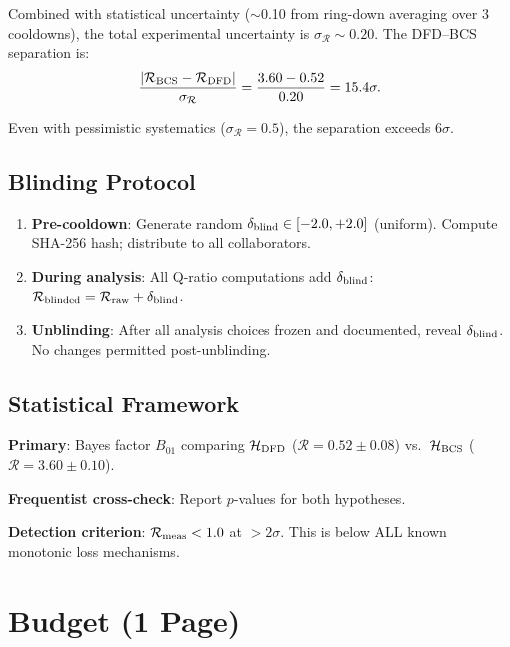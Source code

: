 \documentclass[11pt]{article}
\newcommand{\Rq}{\mathcal{R}}
\begin{document}
Combined with statistical uncertainty ($\sim$0.10 from ring-down
averaging over 3 cooldowns), the total experimental uncertainty is
$\sigma_{\Rq} \sim 0.20$. The DFD--BCS separation is:
\begin{equation}
\frac{|\Rq_{\rm BCS} - \Rq_{\rm DFD}|}{\sigma_{\Rq}}
= \frac{3.60 - 0.52}{0.20} = 15.4\sigma.
\end{equation}

Even with pessimistic systematics ($\sigma_{\Rq} = 0.5$), the
separation exceeds $6\sigma$.

\subsection{Blinding Protocol}

\begin{enumerate}[nosep]
\item \textbf{Pre-cooldown}: Generate random $\delta_{\rm blind}
  \in [-2.0, +2.0]$ (uniform). Compute SHA-256 hash; distribute to
  all collaborators.
\item \textbf{During analysis}: All Q-ratio computations add
  $\delta_{\rm blind}$: $\Rq_{\rm blinded} = \Rq_{\rm raw} +
  \delta_{\rm blind}$.
\item \textbf{Unblinding}: After all analysis choices frozen and
  documented, reveal $\delta_{\rm blind}$. No changes permitted
  post-unblinding.
\end{enumerate}

\subsection{Statistical Framework}

\textbf{Primary}: Bayes factor $B_{01}$ comparing
$\mathcal{H}_{\rm DFD}$ ($\Rq = 0.52 \pm 0.08$) vs.\
$\mathcal{H}_{\rm BCS}$ ($\Rq = 3.60 \pm 0.10$).

\textbf{Frequentist cross-check}: Report $p$-values for both
hypotheses.

\textbf{Detection criterion}: $\Rq_{\rm meas} < 1.0$ at $>2\sigma$.
This is below ALL known monotonic loss mechanisms.


\section{Budget (1 Page)}
\label{sec:budget}
\end{document}
